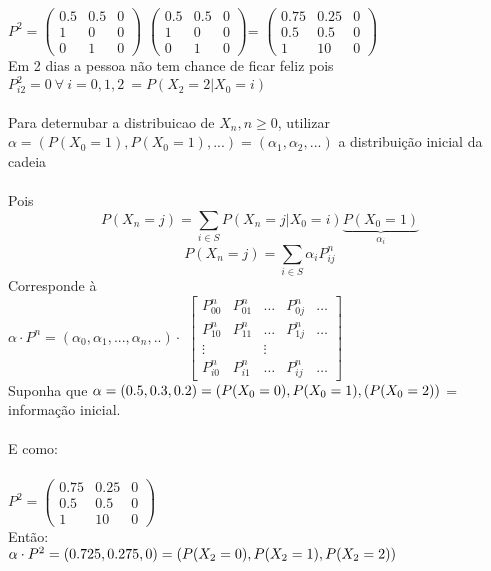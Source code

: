 \documentclass[a4paper,12pt]{article}
\begin{document}
 		\(
 		P^2=
 		\left({\begin{array}{ccc}
 			0.5& 0.5&0 \\
 			1 & 0&0 \\
 			0&1&0
 			\end{array} } \right)
 		\)
 			\(
 		\left( {\begin{array}{ccc}
 			0.5& 0.5&0 \\
 			1 & 0&0 \\
 			0&1&0
 			\end{array} } \right)
 		\)=
 		\(
 	\left( {\begin{array}{ccc}
 		0.75& 0.25&0 \\
 		0.5& 0.5&0 \\
 		1&10&0
 		\end{array} } \right)
 	\)
 		\\
 		Em 2 dias a pessoa n\~ao tem chance de ficar feliz pois $P_{i2}^2=0\ \forall \ i=0,1,2\ =P(X_2=2|
 	X_0=i) $ \\
 		\\
 		Para deternubar a distribuicao de ${X_n,n\ge0}$, utilizar $\alpha=(P(X_0=1),P(X_0=1),...)=(\alpha_1,\alpha_2,...)$ a distribui\c{c}\~ao inicial da cadeia\\
 		\\
 		Pois
 		$$P(X_n=j)=\mathop\sum\limits_{i\in S}P(X_n=j|X_0=i)\underbrace{P(X_0=1)}_{\alpha_i}$$
 		$$	P(X_n=j)=\mathop\sum\limits_{i\in S}\alpha_iP_{ij}^n$$
 		Corresponde \`a\\
 		$
 		\alpha\cdot P^n=(\alpha_0,\alpha_1,...,\alpha_n,..)\cdot$
 		\(
 			 {\begin{bmatrix}
 				P_{00}^n& P_{01}^n&\dots&P_{0j}^n&\dots \\
 					P_{10}^n& P_{11}^n&\dots&P_{1j}^n&\dots \\
 				 \vdots&  & \vdots& \\
 				 	P_{i0}^n& P_{i1}^n&\dots&P_{ij}^n&\dots
 		\end{bmatrix} } 
 		\)
 				\\
 				Suponha que $\alpha=(0.5,0.3,0.2)=\\
 				(P(X_0=0),P(X_0=1),(P(X_0=2)) $ = informa\c{c}\~ao inicial.\\
 				\\
 				E como:\\
 				\\
 				
 					\(P^2=
 				\left( {\begin{array}{ccc}
 					0.75& 0.25&0 \\
 					0.5& 0.5&0 \\
 					1&10&0
 					\end{array} } \right)
 				\)
 				\\Ent\~ao:\\
 				$\alpha\cdot P^2=(0.725,0.275,0)=\\(P(X_2=0),P(X_2=1),P(X_2=2))$
 				\\
 				
\end{document}
